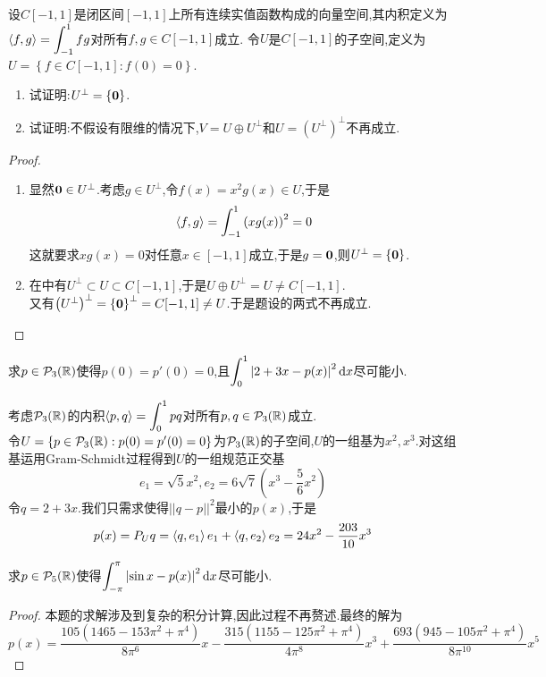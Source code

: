\documentclass{ctexart}
\begin{document}
\begin{problem}[16.]
    设$C[-1,1]$是闭区间$[-1,1]$上所有连续实值函数构成的向量空间,其内积定义为$\displaystyle \left\langle{f},{g}\right\rangle=\int_{-1}^{1}fg$对所有$f,g\in C[-1,1]$成立.%
    令$U$是$C[-1,1]$的子空间,定义为$U=\left\{f\in C[-1,1]:f(0)=0\right\}$.
    \begin{enumerate}[label=\tbf{(\arabic*)}]
        \item 试证明:$U^\bot=\{\mathbf0\}$.
        \item 试证明:不假设有限维的情况下,$V=U\oplus U^\bot$和$U=\left(U^{\bot}\right)^{\bot}$不再成立.
    \end{enumerate}
\end{problem}
\begin{proof}
    \begin{enumerate}[label=\tbf{(\arabic*)}]
        \item 显然$\mathbf0\in U^\bot$.考虑$g\in U^\bot$,令$f(x)=x^2g(x)\in U$,于是
            \[\left\langle{f},{g}\right\rangle=\int_{-1}^{1}\left(xg(x)\right)^2=0\]
            这就要求$xg(x)=0$对任意$x\in[-1,1]$成立,于是$g=\mathbf0$,则$U^\bot=\{\mathbf0\}$.
        \item 在中有$U^\bot\subset U\subset C[-1,1]$,于是$U\oplus U^\bot=U\neq C[-1,1]$.\\
            又有$\left(U^\bot\right)^\bot=\left\{\mathbf0\right\}^{\bot}=C[-1,1]\neq U$.于是题设的两式不再成立.
    \end{enumerate}
\end{proof}
\begin{problem}[17.]
    求$p\in\mathcal{P}_3(\mathbb{R})$使得$p(0)=p'(0)=0$,且$\displaystyle\int_{0}^{1}\left|2+3x-p(x)\right|^2\mathrm{d} x$尽可能小.
\end{problem}
\begin{solution}
    考虑$\mathcal{P}_3(\mathbb{R})$的内积$\left\langle{p},{q}\right\rangle=\displaystyle\int_{0}^{1}pq$对所有$p,q\in\mathcal{P}_3(\mathbb{R})$成立.\\
    令$U=\{p\in\mathcal{P}_3(\mathbb{R}):p(0)=p'(0)=0\}$为$\mathcal{P}_3(\mathbb{R})$的子空间,$U$的一组基为$x^2,x^3$.对这组基运用Gram-Schmidt过程得到$U$的一组规范正交基
    \[e_1=\sqrt5x^2,e_2=6\sqrt7\left(x^3-\dfrac56x^2\right)\]
    令$q=2+3x$.我们只需求使得$||q-p||^2$最小的$p(x)$,于是
    \[p(x)=P_Uq=\left\langle{q},{e_1}\right\rangle e_1+\left\langle{q},{e_2}\right\rangle e_2=24x^2-\dfrac{203}{10}x^3\]
\end{solution}
\begin{problem}[18.]
    求$p\in\mathcal{P}_5(\mathbb{R})$使得$\displaystyle\int_{-\pi}^{\pi}\left|\sin x-p(x)\right|^2\mathrm{d} x$尽可能小.
\end{problem}
\begin{proof}
    本题的求解涉及到复杂的积分计算,因此过程不再赘述.最终的解为
    \[p(x)=\dfrac{105\left(1465-153\pi^2+\pi^4\right)}{8\pi^6}x-\dfrac{315\left(1155-125\pi^2+\pi^4\right)}{4\pi^8}x^3+\dfrac{693\left(945-105\pi^2+\pi^4\right)}{8\pi^{10}}x^5\]
\end{proof}
\end{document}
